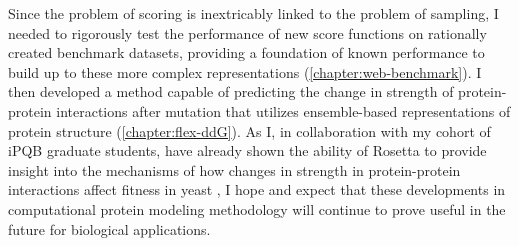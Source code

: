 Since the problem of scoring is inextricably linked to the problem of sampling, I needed to rigorously test the performance of new score functions on rationally created benchmark datasets, providing a foundation of known performance to build up to these more complex representations (\cref{chapter:web-benchmark}).
I then developed a method capable of predicting the change in strength of protein-protein interactions after mutation that utilizes ensemble-based representations of protein structure (\cref{chapter:flex-ddG}).
As I, in collaboration with my cohort of iPQB graduate students, have already shown the ability of Rosetta to provide insight into the mechanisms of how changes in strength in protein-protein interactions affect fitness in yeast \cite{mavor_determination_2016,mavor_extending_2017}, I hope and expect that these developments in computational protein modeling methodology will continue to prove useful in the future for biological applications.